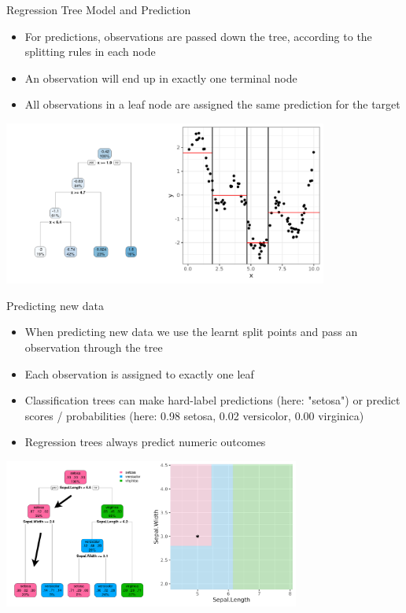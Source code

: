 \documentclass[11pt,compress,t,notes=noshow, xcolor=table]{beamer}
\begin{document}
\begin{vbframe}{Regression Tree Model and Prediction}
  \begin{itemize}
    \item For predictions, observations are passed down the tree, according to the splitting rules
      in each node
    \item An observation will end up in exactly one terminal node
    \item All observations in a leaf node are assigned the same prediction for the target
  \end{itemize}

\color{fgcolor}
{\centering \includegraphics[width=0.8\textwidth, keepaspectratio]{figure/tree-regr-depth3.pdf}

}

\end{vbframe}



\begin{vbframe}{Predicting new data}
\begin{itemize}
\item When predicting new data we use the learnt split points and pass an observation through the tree
\item Each observation is assigned to exactly one leaf
\item Classification trees can make hard-label predictions (here: "setosa") or predict scores / probabilities (here: 0.98 setosa, 0.02 versicolor, 0.00 virginica)
\item Regression trees always predict numeric outcomes
\end{itemize}

\color{fgcolor}
{\centering \includegraphics[width=0.73\textwidth, keepaspectratio]{figure/no-points-classif-depth3.pdf}

}
\end{vbframe}
\end{document}
